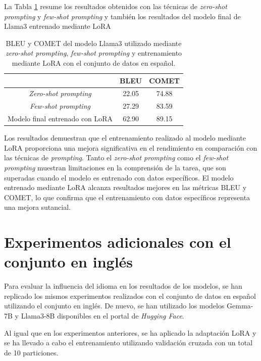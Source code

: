 \documentclass[11pt,spanish,listoffigures,listoftables]{tfgetsinf}
\begin{document}
La Tabla \ref{tab:promptingEspañol} resume los resultados obtenidos con las técnicas de \textit{zero-shot prompting} y \textit{few-shot prompting}  y también los resultados del modelo final de Llama3 entrenado mediante LoRA

\begin{table}[!h]
\caption{BLEU y COMET del modelo Llama3 utilizado mediante \textit{zero-shot prompting}, \textit{few-shot prompting} y entrenamiento mediante LoRA con el conjunto de datos en español.}
\begin{center}
\begin{tabular}{ c | c c }
	\ & BLEU & COMET \\
	\hline
	\hline
	\textit{Zero-shot prompting} & 22.05 & 74.88  \\
	\textit{Few-shot prompting} & 27.29 & 83.59 \\
	Modelo final entrenado con LoRA & 62.90 & 89.15 \\

\end{tabular}
\end{center}
\label{tab:promptingEspañol}
\end{table}

Los resultados demuestran que el entrenamiento realizado al modelo mediante LoRA proporciona una mejora significativa en el rendimiento en comparación con las técnicas de \textit{prompting}. Tanto el \textit{zero-shot prompting} como el \textit{few-shot prompting} muestran limitaciones en la comprensión de la tarea, que son superadas cuando el modelo es entrenado con datos específicos. El modelo entrenado mediante LoRA alcanza resultados mejores en las métricas BLEU y COMET, lo que confirma que el entrenamiento con datos específicos representa una mejora sutancial.

\section{Experimentos adicionales con el conjunto en inglés}

Para evaluar la influencia del idioma en los resultados de los modelos, se han replicado los mismos experimentos realizados con el conjunto de datos en español utilizando el conjunto en inglés. De nuevo, se han utilizado los modelos Gemma-7B y Llama3-8B disponibles en el portal de \textit{Hugging Face}.

Al igual que en los experimentos anteriores, se ha aplicado la adaptación LoRA y se ha llevado a cabo el entrenamiento utilizando validación cruzada con un total de 10 particiones.
\end{document}
